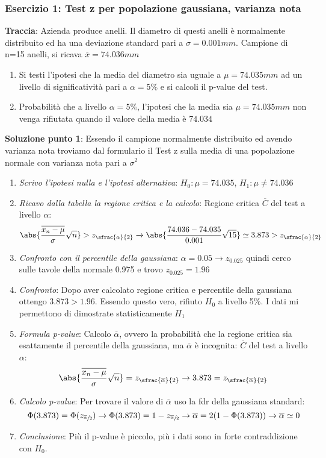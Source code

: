 \subsubsection{Esercizio 1: Test z per popolazione gaussiana, varianza nota }

\textbf{Traccia}: Azienda produce anelli. Il diametro di questi anelli è normalmente distribuito ed ha una deviazione standard pari a $\sigma=0.001 mm$. Campione di n=15 anelli, si ricava $\overline{x} = 74.036 mm$
\begin{enumerate}
    \item Si testi l'ipotesi che la media del diametro sia uguale a $\mu = 74.035 mm$ ad un livello di significatività pari a $\alpha = 5\%$ e si calcoli il p-value del test.
    \item Probabilità che a livello $\alpha = 5\%$, l'ipotesi che la media sia $\mu = 74.035 mm$ non venga rifiutata quando il valore della media è $74.034$
\end{enumerate}

\ind \textbf{Soluzione punto 1}: Essendo il campione normalmente distribuito ed avendo varianza nota troviamo dal formulario il Test z sulla media di una popolazione normale con varianza nota pari a $\sigma^2$
\begin{enumerate}
    \item \textit{Scrivo l'ipotesi nulla e l'ipotesi alternativa}: $H_0 : \mu = 74.035$, $H_1 : \mu \neq 74.036$
    \item \textit{Ricavo dalla tabella la regione critica e la calcolo}: Regione critica $\overline{C}$ del test a livello $\alpha$: $$ \abs{ \dfrac{\overline{x_n - \mu }}{\sigma} \sqrt{n}} > z_{\sfrac{\alpha}{2}} \xrightarrow{} \abs{\dfrac{74.036 - 74.035}{0.001} \sqrt{15}} \simeq 3.873 > z_{\sfrac{\alpha}{2}}$$
    \item \textit{Confronto con il percentile della gaussiana}: $\alpha = 0.05 \xrightarrow{} z_{0.025}$ quindi cerco sulle tavole della normale 0.975 e trovo $z_{0.025} = 1.96$
    \item \textit{Confronto}: Dopo aver calcolato regione critica e percentile della gaussiana ottengo $ 3.873 > 1.96$. Essendo questo vero, rifiuto $H_0$ a livello 5\%. I dati mi permettono di dimostrate statisticamente $H_1$
    \item \textit{Formula p-value}: Calcolo $\overline{\alpha}$, ovvero la probabilità che la regione critica sia esattamente il percentile della gaussiana, ma $\overline{\alpha}$ è incognita: $\overline{C}$ del test a livello $\alpha$: $$ \abs{ \dfrac{\overline{x_n - \mu }}{\sigma} \sqrt{n}} = z_{\sfrac{\overline{\alpha}}{2}} \xrightarrow{} 3.873 = z_{\sfrac{\overline{\alpha}}{2}}$$ 
    \item \textit{Calcolo p-value}: Per trovare il valore di $\overline{\alpha}$ uso la fdr della gaussiana standard: $$\Phi(3.873) = \Phi(z_{\sfrac{\overline{\alpha}}{2}}) \xrightarrow{} \Phi(3.873) = 1 - z_{\sfrac{\overline{\alpha}}{2}} \xrightarrow{} \overline{\alpha} = 2(1 - \Phi(3.873)) \xrightarrow{} \overline{\alpha} \simeq 0$$
    \item \textit{Conclusione}: Più il p-value è piccolo, più i dati sono in forte contraddizione con $H_0$.
\end{enumerate}


